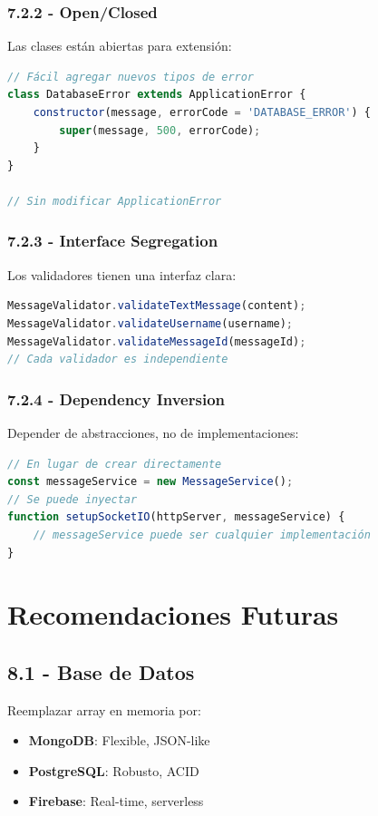 \documentclass[12pt,a4paper]{article}
\begin{document}
\subsubsection{7.2.2 - Open/Closed}
Las clases están abiertas para extensión:
\begin{lstlisting}[language=JavaScript]
// Fácil agregar nuevos tipos de error
class DatabaseError extends ApplicationError {
    constructor(message, errorCode = 'DATABASE_ERROR') {
        super(message, 500, errorCode);
    }
}

// Sin modificar ApplicationError
\end{lstlisting}

\subsubsection{7.2.3 - Interface Segregation}
Los validadores tienen una interfaz clara:
\begin{lstlisting}[language=JavaScript]
MessageValidator.validateTextMessage(content);
MessageValidator.validateUsername(username);
MessageValidator.validateMessageId(messageId);
// Cada validador es independiente
\end{lstlisting}

\subsubsection{7.2.4 - Dependency Inversion}
Depender de abstracciones, no de implementaciones:
\begin{lstlisting}[language=JavaScript]
// En lugar de crear directamente
const messageService = new MessageService();
// Se puede inyectar
function setupSocketIO(httpServer, messageService) {
    // messageService puede ser cualquier implementación
}
\end{lstlisting}

\newpage

\section{Recomendaciones Futuras}

\subsection{8.1 - Base de Datos}
Reemplazar array en memoria por:
\begin{itemize}
    \item \textbf{MongoDB}: Flexible, JSON-like
    \item \textbf{PostgreSQL}: Robusto, ACID
    \item \textbf{Firebase}: Real-time, serverless
\end{itemize}
\end{document}
